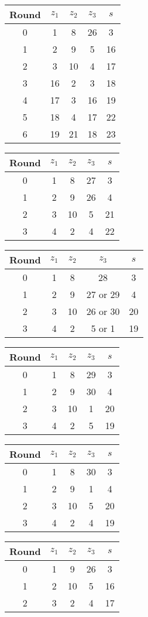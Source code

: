 \begin{multicols}{2}
\begin{tabular}{c | c | c | c | c }
Round & $z_1$ & $z_2$ & $z_3$ & $s$ \\
\hline
0 & 1 & 8 & 26 & 3  \\
1 & 2 & 9 & 5 & 16 \\
2 & 3 & 10 & 4 & 17 \\
3 & 16 & 2 & 3 & 18 \\
4 & 17 & 3 & 16 & 19 \\
5 & 18 & 4 & 17 & 22 \\
6 & 19 & 21 & 18 & 23
\end{tabular}


\begin{tabular}{c | c | c | c | c }
Round & $z_1$ & $z_2$ & $z_3$ & $s$ \\
\hline
0 & 1 & 8 & 27 & 3 \\
1 & 2 & 9 & 26 & 4 \\
2 & 3 & 10 & 5 & 21 \\
3 & 4 & 2 & 4 & 22
\end{tabular}


\begin{tabular}{c | c | c | c | c }
Round & $z_1$ & $z_2$ & $z_3$ & $s$ \\
\hline
0 & 1 & 8 & 28 & 3 \\
1 & 2 & 9 & 27 or 29 & 4 \\
2 & 3 & 10 & 26 or 30 & 20 \\
3 & 4 & 2 & 5 or 1 & 19
\end{tabular}


\begin{tabular}{c | c | c | c | c }
Round & $z_1$ & $z_2$ & $z_3$ & $s$ \\
\hline
0 & 1 & 8 & 29 & 3 \\
1 & 2 & 9 & 30 & 4 \\
2 & 3 & 10 & 1 & 20 \\
3 & 4 & 2 & 5 & 19
\end{tabular}


\begin{tabular}{c | c | c | c | c }
Round & $z_1$ & $z_2$ & $z_3$ & $s$ \\
\hline
0 & 1 & 8 & 30 & 3 \\
1 & 2 & 9 & 1 & 4 \\
2 & 3 & 10 & 5 & 20 \\
3 & 4 & 2 & 4 & 19
\end{tabular}

\begin{tabular}{c | c | c | c | c }
Round & $z_1$ & $z_2$ & $z_3$ & $s$ \\
\hline
0 & 1 & 9 & 26 & 3 \\
1 & 2 & 10 & 5 & 16 \\
2 & 3 & 2 & 4 & 17
\end{tabular}


\end{multicols}
